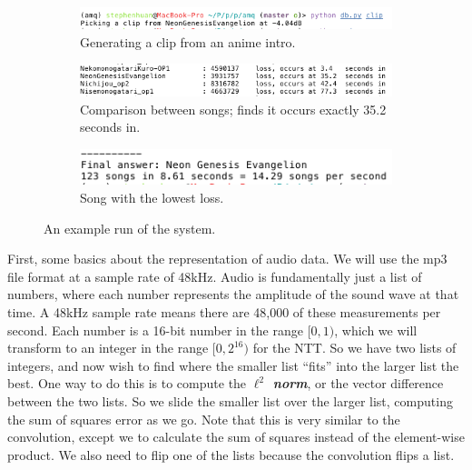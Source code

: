 \documentclass[11pt, oneside]{article}
\newcommand{\emphasis}[1]{\textbf{\textit{#1}}}
\theoremstyle{plain}
\theoremstyle{definition}
\begin{document}
\begin{figure}[h!]
    \centering
    \begin{subfigure}[h]{1 \textwidth}
      \includegraphics[scale=0.7]{clip.png}
      \caption{Generating a clip from an anime intro.}
    \end{subfigure}
    
    \begin{subfigure}[h]{0.3 \textwidth}
      \includegraphics[scale=0.5]{compare.png}
      \caption{Comparison between songs; finds it occurs exactly 35.2 seconds in.}
    \end{subfigure}
    \hfill
    \begin{subfigure}[h]{0.3 \textwidth}
      \includegraphics[scale=0.5]{result.png}
      \caption{Song with the lowest loss.}
    \end{subfigure}
    \caption{An example run of the system.}
\end{figure}

First, some basics about the representation of audio data. We will use the
mp3 file format at a sample rate of 48kHz. 
Audio is fundamentally just a list of numbers, where each number represents
the amplitude of the sound wave at that time. A 48kHz sample rate means 
there are 48,000 of these measurements per second.
Each number is a 16-bit number in the range \( [0, 1) \), which we
will transform to an integer in the range \( [0, 2^{16}) \) for the NTT.
So we have two lists of integers, and now wish to find where the smaller list
\enquote{fits} into the larger list the best. One way to do this is to compute
the \emphasis{\( \ell^2 \) norm}, or the vector difference between the two lists.
So we slide the smaller list over the larger list, computing the sum of squares
error as we go. Note that this is very similar to the convolution, except
we to calculate the sum of squares instead of the element-wise product.
We also need to flip one of the lists because the convolution flips a list.
\end{document}
